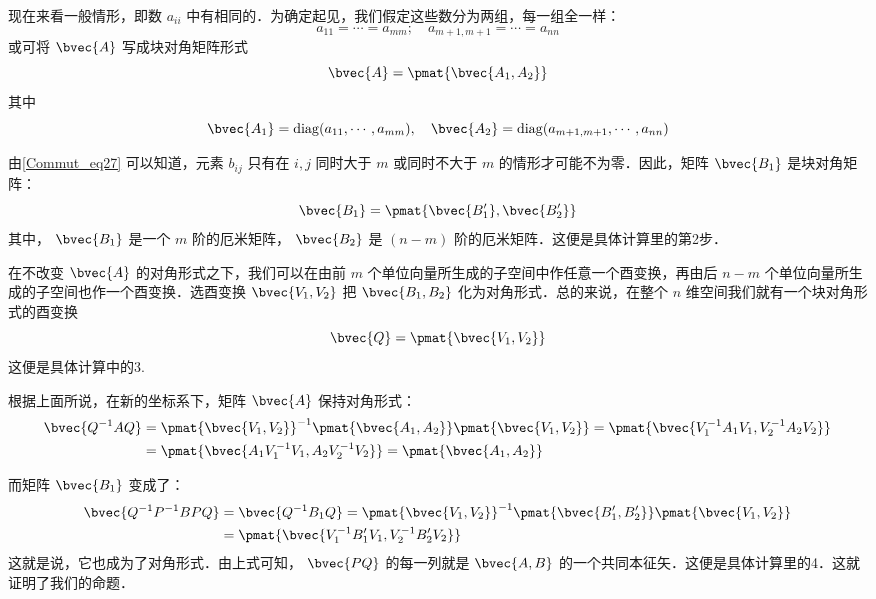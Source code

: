现在来看一般情形，即数 $a_{ii}$ 中有相同的．为确定起见，我们假定这些数分为两组，每一组全一样：
\begin{equation}
a_{11}=\cdots=a_{mm};\quad a_{m+1,m+1}=\cdots=a_{nn}
\end{equation}
或可将 $\bvec{A}$ 写成块对角矩阵形式
\begin{equation}
\bvec{A}=\pmat{\bvec{A_1,A_2}}
\end{equation}
其中
\begin{equation}
\bvec{A_1}=\mathrm{diag}(a_{11},\cdots,a_{mm}),\quad
\bvec{A_2}=\mathrm{diag}(a_{m+1,m+1},\cdots,a_{nn})
\end{equation}

由\autoref{Commut_eq27} 可以知道，元素 $b_{ij}$ 只有在 $i,j$ 同时大于 $m$ 或同时不大于 $m$ 的情形才可能不为零．因此，矩阵 $\bvec{B_1}$ 是块对角矩阵：
\begin{equation}
\bvec{B_1}=\pmat{\bvec{B'_1},\bvec{B'_2}}
\end{equation}
其中， $\bvec{B_1}$ 是一个 $m$ 阶的厄米矩阵， $\bvec{B_2}$ 是 $(n-m)$ 阶的厄米矩阵．这便是具体计算里的第2步．

在不改变 $\bvec{A}$ 的对角形式之下，我们可以在由前 $m$ 个单位向量所生成的子空间中作任意一个酉变换，再由后 $n-m$ 个单位向量所生成的子空间也作一个酉变换．选酉变换 $\bvec{V_1,V_2}$ 把 $\bvec{B_1,B_2}$ 化为对角形式．总的来说，在整个 $n$ 维空间我们就有一个块对角形式的酉变换
\begin{equation}
\bvec{Q}=\pmat{\bvec{V_1,V_2}}
\end{equation}
这便是具体计算中的3.

根据上面所说，在新的坐标系下，矩阵 $\bvec{A}$ 保持对角形式：
\begin{equation}
\begin{aligned}
\bvec{Q^{-1}AQ}&=\pmat{\bvec{V_1,V_2}}^{-1}\pmat{\bvec{A_1,A_2}}\pmat{\bvec{V_1,V_2}}=\pmat{\bvec{V_1^{-1}A_1V_1,V_2^{-1}A_2V_2}}\\
&=\pmat{\bvec{A_1V_1^{-1}V_1,A_2V_2^{-1}V_2}}=\pmat{\bvec{A_1,A_2}}
\end{aligned}
\end{equation}

而矩阵 $\bvec{B_1}$ 变成了：
\begin{equation}
\begin{aligned}
\bvec{Q^{-1}P^{-1}BPQ}&=\bvec{Q^{-1}B_1Q}=\pmat{\bvec{V_1,V_2}}^{-1}\pmat{\bvec{B'_1,B'_2}}\pmat{\bvec{V_1,V_2}}\\
&=\pmat{\bvec{V_1^{-1}B'_1V_1,V_2^{-1}B'_2V_2}}\\
\end{aligned}
\end{equation}
这就是说，它也成为了对角形式．由上式可知， $\bvec{PQ}$ 的每一列就是 $\bvec{A,B}$ 的一个共同本征矢．这便是具体计算里的4．这就证明了我们的命题．


